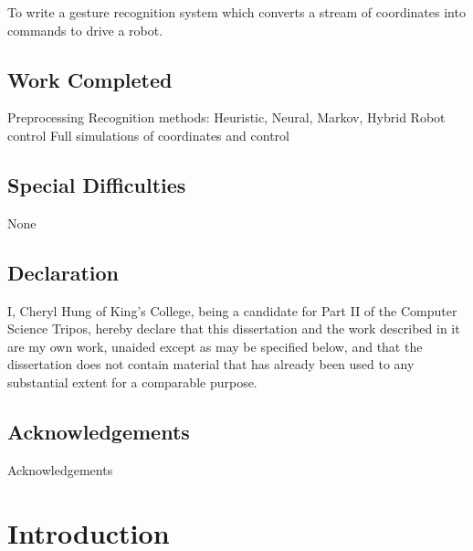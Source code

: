 \documentclass[12pt,a4,notitlepage]{report}
\renewcommand{\_}{\texttt{\symbol{95}}}
\newcommand{\<}{\texttt{\symbol{60}}}
\renewcommand{\>}{\texttt{\symbol{62}}}
\begin{document}
To write a gesture recognition system which converts a stream of coordinates into commands to drive a robot.

\section*{Work Completed}

Preprocessing
Recognition methods: Heuristic, Neural, Markov, Hybrid
Robot control
Full simulations of coordinates and control

\section*{Special Difficulties}

None
 
\newpage
\section*{Declaration}

I, Cheryl Hung of King's College, being a candidate for Part II of the Computer Science Tripos, hereby declare that this dissertation and the work described in it are my own work, unaided except as may be specified below, and that the dissertation does not contain material that has already been used to any substantial extent for a comparable purpose.

\bigskip
{}

\medskip
{}

\cleardoublepage

\tableofcontents

\listoffigures

\newpage
\section*{Acknowledgements}

Acknowledgements


\cleardoublepage        %

\setcounter{page}{1}
\pagestyle{headings}

\chapter{Introduction}
\end{document}
